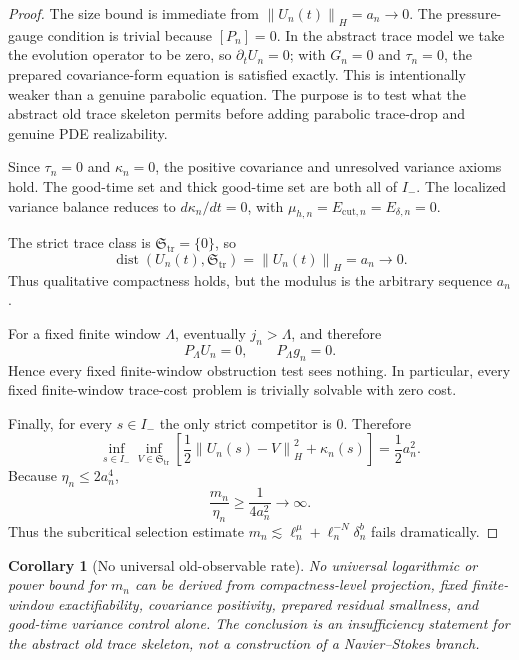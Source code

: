\documentclass[11pt]{article}
\numberwithin{equation}{section}
\newtheorem{corollary}[theorem]{Corollary}
\DeclareMathOperator{\dist}{dist}
\newcommand{\norm}[2]{\left\|#1\right\|_{#2}}
\newcommand{\frakS}{\mathfrak S}
\begin{document}
\begin{proof}
The size bound is immediate from \(\norm{U_n(t)}{H}=a_n\to0\).  The pressure-gauge condition is trivial because \([P_n]=0\).  In the abstract trace model we take the evolution operator to be zero, so \(\partial_tU_n=0\); with \(G_n=0\) and \(\tau_n=0\), the prepared covariance-form equation is satisfied exactly.  This is intentionally weaker than a genuine parabolic equation.  The purpose is to test what the abstract old trace skeleton permits before adding parabolic trace-drop and genuine PDE realizability.

Since \(\tau_n=0\) and \(\kappa_n=0\), the positive covariance and unresolved variance axioms hold.  The good-time set and thick good-time set are both all of \(I_-\).  The localized variance balance reduces to \(d\kappa_n/dt=0\), with \(\mu_{h,n}=E_{\mathrm{cut},n}=E_{\delta,n}=0\).

The strict trace class is \(\frakS_{\mathrm{tr}}=\{0\}\), so
\[
\dist(U_n(t),\frakS_{\mathrm{tr}})=\norm{U_n(t)}{H}=a_n\to0.
\]
Thus qualitative compactness holds, but the modulus is the arbitrary sequence \(a_n\).

For a fixed finite window \(\Lambda\), eventually \(j_n>\Lambda\), and therefore
\[
P_\Lambda U_n=0,
\qquad
P_\Lambda g_n=0.
\]
Hence every fixed finite-window obstruction test sees nothing.  In particular, every fixed finite-window trace-cost problem is trivially solvable with zero cost.

Finally, for every \(s\in I_-\) the only strict competitor is \(0\).  Therefore
\[
\inf_{s\in I_-}\inf_{V\in\frakS_{\mathrm{tr}}}
\left[\frac12\norm{U_n(s)-V}{H}^2+\kappa_n(s)\right]
=\frac12a_n^2.
\]
Because \(\eta_n\le2a_n^4\),
\[
\frac{m_n}{\eta_n}\ge \frac{1}{4a_n^2}\to\infty.
\]
Thus the subcritical selection estimate \(m_n\lesssim \ell_n^\mu+\ell_n^{-N}\delta_n^b\) fails dramatically.
\end{proof}

\begin{corollary}[No universal old-observable rate]\label{cor:no-old-rate-expanded}
No universal logarithmic or power bound for \(m_n\) can be derived from compactness-level projection, fixed finite-window exactifiability, covariance positivity, prepared residual smallness, and good-time variance control alone.  The conclusion is an insufficiency statement for the abstract old trace skeleton, not a construction of a Navier--Stokes branch.
\end{corollary}
\end{document}
